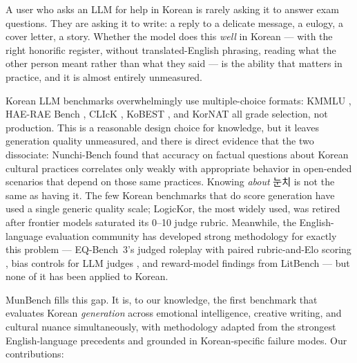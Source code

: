 \documentclass[11pt]{article}
\newcommand{\ko}[1]{#1}
\begin{document}
A user who asks an LLM for help in Korean is rarely asking it to answer exam
questions. They are asking it to write: a reply to a delicate message, a
eulogy, a cover letter, a story. Whether the model does this \emph{well} in
Korean --- with the right honorific register, without translated-English
phrasing, reading what the other person meant rather than what they said ---
is the ability that matters in practice, and it is almost entirely
unmeasured.

Korean LLM benchmarks overwhelmingly use multiple-choice formats: KMMLU
\citep{son2024kmmlu}, HAE-RAE Bench \citep{son2023haerae}, CLIcK
\citep{kim2024click}, KoBEST \citep{jang2022kobest}, and KorNAT
\citep{lee2024kornat} all grade selection, not production. This is a
reasonable design choice for knowledge, but it leaves generation quality
unmeasured, and there is direct evidence that the two dissociate:
Nunchi-Bench \citep{nunchibench2025} found that accuracy on factual
questions about Korean cultural practices correlates only weakly with
appropriate behavior in open-ended scenarios that depend on those same
practices. Knowing \emph{about} \ko{눈치} is not the same as having it.
The few Korean benchmarks that do score generation have used a single
generic quality scale; LogicKor, the most widely used, was retired after
frontier models saturated its 0--10 judge rubric. Meanwhile, the
English-language evaluation community has developed strong methodology for
exactly this problem --- EQ-Bench~3's judged roleplay with paired
rubric-and-Elo scoring \citep{paech2023eqbench}, bias controls for LLM
judges \citep{zheng2023judging}, and reward-model findings from LitBench
\citep{litbench2025} --- but none of it has been applied to Korean.

MunBench fills this gap. It is, to our knowledge, the first benchmark that
evaluates Korean \emph{generation} across emotional intelligence, creative
writing, and cultural nuance simultaneously, with methodology adapted from
the strongest English-language precedents and grounded in
Korean-specific failure modes. Our contributions:
\end{document}
